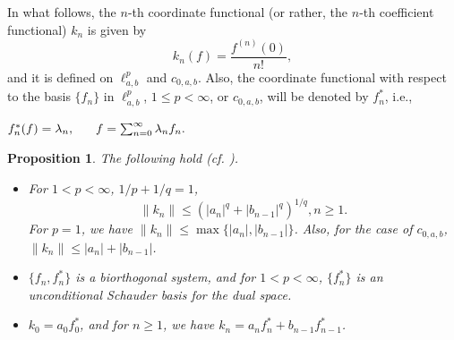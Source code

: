 \documentclass[12pt, reqno]{amsart}
\newtheorem{proposition}[theorem]{Proposition}
\theoremstyle{definition}
\theoremstyle{remark}
\numberwithin{equation}{section}
\begin{document}
In what follows, the $n$-th coordinate functional (or rather, the $n$-th coefficient functional)  $k_n$ is given by 
\[
k_n(f)=\frac {{f}^{(n)}(0)}{n!},
\]
and it is defined on $\ell^p_{a,b}$ and $c_{0,a,b}$. Also, the coordinate functional with respect to the basis $\{f_n\}$ in $\ell^p_{a,b}$, $1\leq p<\infty$, or $c_{0,a,b}$, will be denoted by $f_n^*$, i.e.,
\begin{center}
$f_n^*(f)=\lambda_n,\hskip .6cm f=\sum_{n=0}^{\infty}\lambda_n f_n.$
\end{center}




\begin{proposition}\label{k_{n}} 
 The following hold \emph{(cf. \cite{Das-Mundayadan})}.
    \begin{itemize}
    \item[(i)] For $1<p<\infty$, $1/p+1/q=1$,
    \[
    \|k_n\|\leq (|a_n|^q+|b_{n-1}|^q)^{1/q}, n\geq 1.
    \]
    For $p=1$, we have $\|k_n\|\leq \max\{|a_n|,|b_{n-1}|\}$. Also, for the case of $c_{0,a,b}$, $\|k_n\|\leq |a_n|+|b_{n-1}|$. 
    \item[(ii)]  $\{f_n,f_n^*\}$ is a biorthogonal system, and for $1<p<\infty$, $\{f_n^*\}$ is an unconditional Schauder basis for the dual space.
    \item[(iii)] $k_0=a_0f_0^*$, and for $n\geq 1$, we have $k_n=a_nf_n^*+b_{n-1}f_{n-1}^*$.
   \end{itemize}
\end{proposition}
\end{document}

